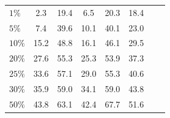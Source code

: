 \begin{center}
\begin{tabular*}{\textwidth}{@{\extracolsep{\fill}}lccccccc}
 \midrule 
$1\%$      & 2.3& 19.4& 6.5& 20.3& 18.4\\ 
$5\%$      & 7.4& 39.6& 10.1& 40.1& 23.0\\ 
$10\%$     & 15.2& 48.8& 16.1& 46.1& 29.5\\ 
$20\%$     & 27.6& 55.3& 25.3& 53.9& 37.3\\ 
$25\%$     & 33.6& 57.1& 29.0& 55.3& 40.6\\ 
$30\%$     & 35.9& 59.0& 34.1& 59.0& 43.8\\ 
$50\%$     & 43.8& 63.1& 42.4& 67.7& 51.6\\ 
\bottomrule 
\end{tabular*} 
\end{center}

